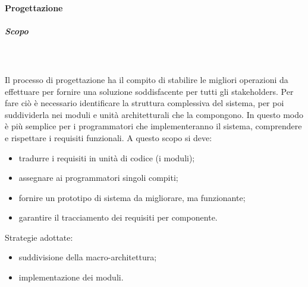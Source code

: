 	\paragraph{Progettazione}
			\subparagraph{Scopo} \mbox{} \\ \mbox{} \\
		Il processo di progettazione ha il compito di stabilire le migliori operazioni da effettuare per fornire una soluzione soddisfacente per tutti gli stakeholders\glo. Per fare ciò è necessario identificare la struttura complessiva del sistema, per poi suddividerla nei moduli e unità architetturali che la compongono. In questo modo è più semplice per i programmatori che implementeranno il sistema, comprendere e rispettare i requisiti funzionali.
			A questo scopo si deve:
			\begin{itemize}
			\item tradurre i requisiti in unità di codice (i moduli);
			\item assegnare ai programmatori singoli compiti;
			\item fornire un prototipo di sistema da migliorare, ma funzionante;
			\item garantire il tracciamento dei requisiti per componente.
			\end{itemize}
			Strategie adottate:
			\begin{itemize}			
			\item suddivisione della macro-architettura;
			\item implementazione dei moduli.
			\end{itemize}

